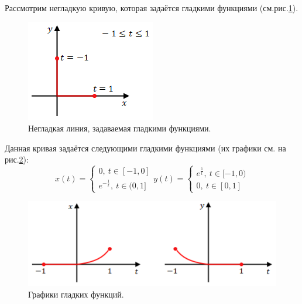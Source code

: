 \begin{example}
    Рассмотрим негладкую кривую, которая задаётся гладкими функциями (см.рис.\ref{fig:c12.1}).
    \begin{figure}[ht]
        \centering
        \includegraphics[scale=0.7]{images/c12.1.png}
        \caption{Негладкая линия, задаваемая гладкими функциями.}
        \label{fig:c12.1}
    \end{figure}

    Данная кривая задаётся следующими гладкими функциями (их графики см. на рис.\ref{fig:c12.2}):
    \[x(t) = \begin{cases}
        0,\ t \in [-1,0] \\
        e^{-\frac{1}{t}},\ t \in (0,1]
    \end{cases}
    y(t) = \begin{cases}
        e^{\frac{1}{t}},\ t \in [-1,0) \\
        0,\ t \in [0,1]
    \end{cases}
    \]

    \begin{figure}[ht]
        \centering
        \includegraphics[scale=0.5]{images/c12.2.png}
        \caption{Графики гладких функций.}
        \label{fig:c12.2}
    \end{figure}
\end{example}

